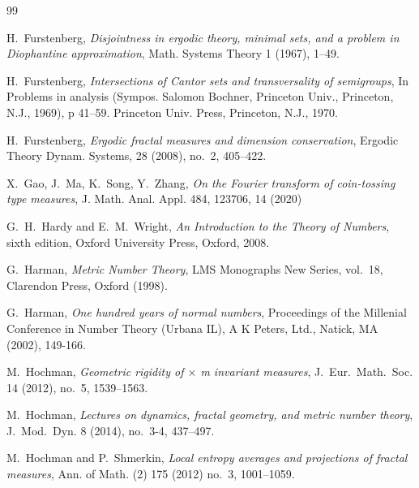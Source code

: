 \documentclass[12pt, twoside]{article}
\def\red{\color{red}}
\theoremstyle{definition}
\numberwithin{equation}{section}
\begin{document}
\begin{thebibliography}{99}

H.~Furstenberg, 
{\em{Disjointness in ergodic theory, minimal sets, and a problem in Diophantine
approximation}}, 
Math. Systems Theory 1 (1967), 1--49. 

H.~Furstenberg, 
{\em{Intersections of Cantor sets and transversality of semigroups}}, In Problems in
analysis (Sympos. Salomon Bochner, Princeton Univ., Princeton, N.J., 1969), p 41--59. Princeton
Univ. Press, Princeton, N.J., 1970. 

H.~Furstenberg, 
{\em{Ergodic fractal measures and dimension conservation}}, 
Ergodic Theory Dynam. Systems, 28 (2008), no.~2, 405--422. 

X.~Gao, J.~Ma, K.~Song, Y.~Zhang, 
{\em{On the Fourier transform of coin-tossing type measures}},
J. Math. Anal. Appl. 484, 123706, 14 (2020)

G.~H.~Hardy and E.~M.~Wright,  
{\em{An Introduction to the Theory of Numbers}}, sixth edition, 
Oxford University Press, Oxford, 2008.

G.~Harman, 
{\em{Metric Number Theory}}, 
LMS Monographs New Series, vol.~18, Clarendon Press, Oxford (1998).

G.~Harman, 
{\em{One hundred years of normal numbers}}, 
Proceedings of the Millenial Conference in Number Theory (Urbana IL), A K Peters, Ltd., Natick, MA (2002), 149-166.


M.~Hochman, 
{\em{Geometric rigidity of $\times$ m invariant measures}}, 
J.~Eur.~Math.~Soc. 14 (2012), no.~5, 1539--1563.

M.~Hochman, 
{\em{Lectures on dynamics, fractal geometry, and metric number theory}}, 
J.~Mod.~Dyn. 8 (2014), no.~3-4, 437--497.


M.~Hochman and P.~Shmerkin, 
{\em{Local entropy averages and projections of fractal measures}}, 
Ann. of Math. (2) 175 (2012) no.~3, 1001--1059. 


\end{thebibliography}
\end{document}
